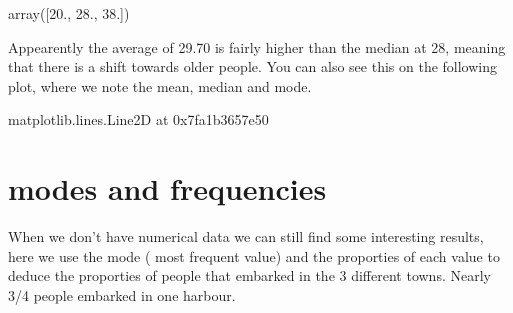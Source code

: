 \documentclass[letterpaper,10pt,english]{jupyterBook}
\begin{document}
\begin{sphinxVerbatim}[commandchars=\\\{\}]
array([20., 28., 38.])
\end{sphinxVerbatim}

\sphinxAtStartPar
Appearently the average of 29.70 is fairly higher than the median at 28, meaning that there is a shift towards older people.
You can also see this on the following plot, where we note the mean, median and mode.

\begin{sphinxVerbatim}[commandchars=\\\{\}]
   

 
 
\PYG{p}{[}\PYG{p}{]} 
\end{sphinxVerbatim}

\begin{sphinxVerbatim}[commandchars=\\\{\}]
\PYGZlt{}matplotlib.lines.Line2D at 0x7fa1b3657e50\PYGZgt{}
\end{sphinxVerbatim}

\noindent{}


\section{modes and frequencies}
\label{\detokenize{c5_data_exploration/variable_identification:modes-and-frequencies}}
\sphinxAtStartPar
When we don’t have numerical data we can still find some interesting results, here we use the mode ( most frequent value) and the proporties of each value to deduce the proporties of people that embarked in the 3 different towns. Nearly 3/4 people embarked in one harbour.
\end{document}

